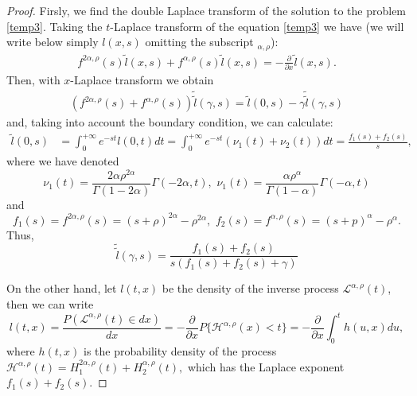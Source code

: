 \documentclass[10pt,a4paper]{amsart}
\begin{document}
	\begin{proof} Firsly, we find the double Laplace transform of the solution  to the problem \eqref{temp3}.
		Taking the $t$-Laplace transform of the equation \eqref{temp3} we have (we  will write below simply ${l}(x,s)$ omitting the subscript $_{\alpha,\rho}$):
		\begin{align*}
			f^{2\alpha, \rho}(s) \tilde{l}(x,s) + f^{\alpha, \rho}(s) \tilde{l}(x,s) = -\frac{\partial}{\partial x} \tilde{l}(x,s).
		\end{align*}
Then, with $x$-Laplace transform we obtain
		\begin{align*}
			(f^{2\alpha, \rho}(s) + f^{\alpha, \rho}(s)) \tilde{\tilde{l}}(\gamma, s) = \tilde{l}(0,s) - \gamma \tilde{\tilde{l}}(\gamma,s)
		\end{align*}
and, taking into account the boundary condition, we can calculate:
		\begin{align*}
			\tilde{l}(0,s) &= \int_0^{+\infty} e^{-st} l(0,t) dt = \int_0^{+\infty} e^{-st} (\nu_1(t) + \nu_2(t)) dt = \frac{f_1(s) + f_2(s)}{s},			
		\end{align*}
where we have denoted
$$\nu_1(t)=\frac{2\alpha \rho^{2\alpha}}{\Gamma(1-2\alpha)} \Gamma(-2\alpha, t), \,\, \nu_1(t)= \frac{\alpha \rho^\alpha}{\Gamma(1-\alpha)} \Gamma(-\alpha, t)$$	
and
$$f_1(s) = f^{2\alpha, \rho}(s) = (s+\rho)^{2\alpha} - \rho^{2\alpha}, \,\,
			f_2(s) = f^{\alpha, \rho}(s) = (s+p)^\alpha - \rho^\alpha.$$
Thus,				
		\begin{equation}\label{temp4}
			\tilde{\tilde{l}}(\gamma, s) = \frac{f_1(s) + f_2(s)}{s(f_1(s) + f_2(s) + \gamma)}
		\end{equation}
		
				On the other hand, let $l(t,x)$ be the density of the inverse process $\mathcal{L}^{\alpha, \rho}(t)$, then we can write
		\begin{equation}\label{(5)}
			l(t,x) = \frac{P(\mathcal{L}^{\alpha, \rho}(t) \in dx)}{dx} = -\frac{\partial}{\partial x} P \{ \mathcal{H}^{\alpha, \rho}(x) < t \} = -\frac{\partial}{\partial x} \int_0^t h(u,x) du,
		\end{equation}
where $h(t,x)$ is the probability density of the 	process	$\mathcal{H}^{\alpha, \rho}(t)=H_1^{2\alpha, \rho}(t) +  H_2^{\alpha,\rho}(t),$ which has the Laplace exponent $f_1(s) + f_2(s)$.


\end{proof}
\end{document}
